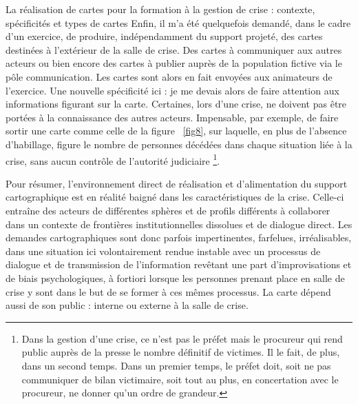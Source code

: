 \documentclass[10pt,a4paper]{report} %
\begin{document}
\begin{part}{La réalisation de cartes pour la formation à la gestion de crise : contexte, spécificités et types de cartes}
Enfin, il m’a été quelquefois demandé, dans le cadre d’un exercice, de produire, indépendamment du support projeté, des cartes destinées à l’extérieur de la salle de crise. Des cartes à communiquer aux autres acteurs ou bien encore des cartes à publier auprès de la population fictive via le pôle communication. Les cartes sont alors en fait envoyées aux animateurs de l’exercice. Une nouvelle spécificité ici : je me devais alors de faire attention aux informations figurant sur la carte. Certaines, lors d’une crise, ne doivent pas être portées à la connaissance des autres acteurs. Impensable, par exemple, de faire sortir une carte comme celle de la figure ~\ref{fig8}, sur laquelle, en plus de l’absence d’habillage, figure le nombre de personnes décédées dans chaque situation liée à la crise, sans aucun contrôle de l’autorité judiciaire \footnote{Dans la gestion d’une crise, ce n’est pas le préfet mais le procureur qui rend public auprès de la presse le nombre définitif de victimes. Il le fait, de plus, dans un second temps. Dans un premier temps, le préfet doit, soit ne pas communiquer de bilan victimaire, soit tout au plus, en concertation avec le procureur, ne donner qu’un ordre de grandeur.}.

Pour résumer, l’environnement direct de réalisation et d’alimentation du support cartographique est en réalité baigné dans les caractéristiques de la crise. Celle-ci entraîne des acteurs de différentes sphères et de profils différents à collaborer dans un contexte de frontières institutionnelles dissolues et de dialogue direct. Les demandes cartographiques sont donc parfois impertinentes, farfelues, irréalisables, dans une situation ici volontairement rendue instable avec un processus de dialogue et de transmission de l’information revêtant une part d’improvisations et de biais psychologiques, à fortiori lorsque les personnes prenant place en salle de crise y sont dans le but de se former à ces mêmes processus. La carte dépend aussi de son public : interne ou externe à la salle de crise.


\end{part}
\end{document}
